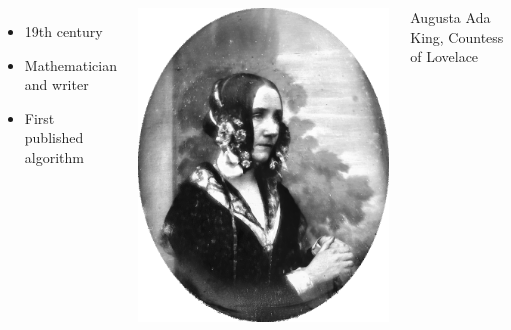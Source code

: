 \documentclass{beamer}
\begin{document}
\begin{frame}
    \begin{columns}
        \begin{itemize}
            \item 19th century  
            \item Mathematician and writer
            \item First published algorithm
        \end{itemize}
        
        \centering
        
        \includegraphics[scale=0.16]{figures/ada.png}
        
        \bigskip
        
        {\scriptsize Augusta Ada King, Countess of Lovelace}
    \end{columns}
    
\end{frame} 
\end{document}

